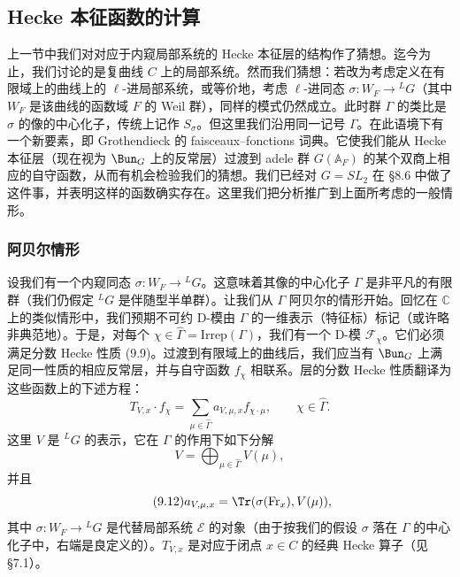 
\subsection{Hecke 本征函数的计算}

上一节中我们对对应于内窥局部系统的 Hecke 本征层的结构作了猜想。迄今为止，我们讨论的是复曲线 $C$ 上的局部系统。然而我们猜想：若改为考虑定义在有限域上的曲线上的 $\ell$-进局部系统，或等价地，考虑 $\ell$-进同态 $\sigma: W_F\to{}^{L}G$（其中 $W_F$ 是该曲线的函数域 $F$ 的 Weil 群），同样的模式仍然成立。此时群 $\Gamma$ 的类比是 $\sigma$ 的像的中心化子，传统上记作 $S_\sigma$。但这里我们沿用同一记号 $\Gamma$。在此语境下有一个新要素，即 Grothendieck 的 faisceaux--fonctions 词典。它使我们能从 Hecke 本征层（现在视为 $\Bun_G$ 上的反常层）过渡到 adele 群 $G(\mathbb{A}_F)$ 的某个双商上相应的自守函数，从而有机会检验我们的猜想。我们已经对 $G=SL_2$ 在 §8.6 中做了这件事，并表明这样的函数确实存在。这里我们把分析推广到上面所考虑的一般情形。

\subsubsection{阿贝尔情形}

设我们有一个内窥同态 $\sigma: W_F\to{}^{L}G$。这意味着其像的中心化子 $\Gamma$ 是非平凡的有限群（我们仍假定 ${}^{L}G$ 是伴随型半单群）。让我们从 $\Gamma$ 阿贝尔的情形开始。回忆在 $\mathbb{C}$ 上的类似情形中，我们预期不可约 D-模由 $\Gamma$ 的一维表示（特征标）标记（或许略非典范地）。于是，对每个 $\chi\in\widehat{\Gamma}=\mathrm{Irrep}(\Gamma)$，我们有一个 D-模 $\mathcal{F}_\chi$。它们必须满足分数 Hecke 性质 (9.9)。过渡到有限域上的曲线后，我们应当有 $\Bun_G$ 上满足同一性质的相应反常层，并与自守函数 $f_\chi$ 相联系。层的分数 Hecke 性质翻译为这些函数上的下述方程：
\begin{equation}\tag{9.10}
T_{V,x}\cdot f_\chi = \sum_{\mu\in\widehat{\Gamma}}a_{V,\mu,x}f_{\chi\cdot\mu},
\qquad \chi\in\widehat{\Gamma}.
\end{equation}
这里 $V$ 是 ${}^{L}G$ 的表示，它在 $\Gamma$ 的作用下如下分解
\begin{equation}\tag{9.11}
V = \bigoplus_{\mu\in\widehat{\Gamma}}V(\mu),
\end{equation}
并且
\begin{equation}\tag{9.12}
a_{V,\mu,x} = \Tr(\sigma(\mathrm{Fr}_x),V(\mu)),
\end{equation}
其中 $\sigma: W_F\to{}^{L}G$ 是代替局部系统 $\mathcal{E}$ 的对象（由于按我们的假设 $\sigma$ 落在 $\Gamma$ 的中心化子中，右端是良定义的）。$T_{V,x}$ 是对应于闭点 $x\in C$ 的经典 Hecke 算子（见 §7.1）。

